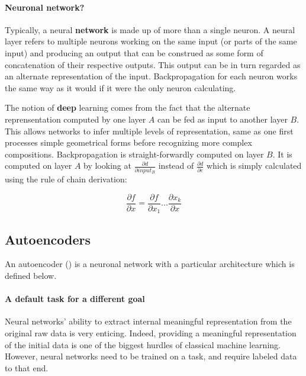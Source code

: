 \documentclass[conference]{IEEEtran}
\begin{document}
\paragraph{Neuronal network?}

Typically, a neural \textbf{network} is made up of more than a single neuron. A
neural layer refers to multiple neurons working on the same input (or parts of
the same input) and producing an output that can be construed as some form of
concatenation of their respective outputs. This output can be in turn regarded
as an alternate representation of the input. Backpropagation for each neuron
works the same way as it would if it were the only neuron calculating.

The notion of \textbf{deep} learning comes from the fact that the alternate
reprensentation computed by one layer $A$ can be fed as input to another layer $B$.
This allows networks to infer multiple levels of representation, same as one
first processes simple geometrical forms before recognizing more complex
compositions. Backpropagation is straight-forwardly computed on layer $B$. It is
computed on layer $A$ by looking at $\frac{\partial d}{\partial input_B}$
instead of $\frac{\partial d}{\partial e}$ which is simply calculated using the
rule of chain derivation:

\begin{equation}
  \frac{\partial f}{\partial x}=\frac{\partial f}{\partial x_1}...\frac{\partial x_k}{\partial x}
\end{equation}

\subsection{Autoencoders}

An autoencoder (\cite{Hinton504}) is a neuronal network with a particular
architecture which is defined below.

\paragraph{A default task for a different goal}

Neural networks' ability to extract internal meaningful representation from the
original raw data is very enticing. Indeed, providing a meaningful
representation of the initial data is one of the biggest hurdles of classical
machine learning. However, neural networks need to be trained on a task, and
require labeled data to that end. 
\end{document}
